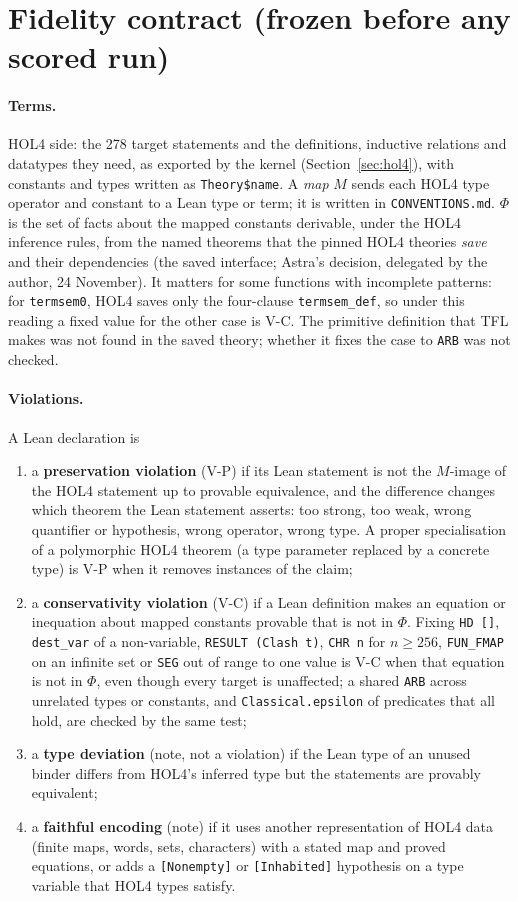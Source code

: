 \documentclass[11pt,a4paper]{article}
\newcommand{\code}[1]{\texttt{#1}}
\begin{document}
\section{Fidelity contract (frozen before any scored run)}\label{sec:contract}
\paragraph{Terms.} HOL4 side: the 278 target statements and the definitions, inductive relations and datatypes they need, as exported by the kernel (Section~\ref{sec:hol4}), with constants and types written as \code{Theory\$name}. A \emph{map} $M$ sends each HOL4 type operator and constant to a Lean type or term; it is written in \code{CONVENTIONS.md}. $\Phi$ is the set of facts about the mapped constants derivable, under the HOL4 inference rules, from the named theorems that the pinned HOL4 theories \emph{save} and their dependencies (the saved interface; Astra's decision, delegated by the author, 24 November). It matters for some functions with incomplete patterns: for \code{termsem0}, HOL4 saves only the four-clause \code{termsem\_def}, so under this reading a fixed value for the other case is V-C. The primitive definition that TFL makes was not found in the saved theory; whether it fixes the case to \code{ARB} was not checked.
\paragraph{Violations.} A Lean declaration is
\begin{enumerate}
\item a \textbf{preservation violation} (V-P) if its Lean statement is not the $M$-image of the HOL4 statement up to provable equivalence, and the difference changes which theorem the Lean statement asserts: too strong, too weak, wrong quantifier or hypothesis, wrong operator, wrong type. A proper specialisation of a polymorphic HOL4 theorem (a type parameter replaced by a concrete type) is V-P when it removes instances of the claim;
\item a \textbf{conservativity violation} (V-C) if a Lean definition makes an equation or inequation about mapped constants provable that is not in $\Phi$. Fixing \code{HD []}, \code{dest\_var} of a non-variable, \code{RESULT (Clash t)}, \code{CHR n} for $n\ge 256$, \code{FUN\_FMAP} on an infinite set or \code{SEG} out of range to one value is V-C when that equation is not in $\Phi$, even though every target is unaffected; a shared \code{ARB} across unrelated types or constants, and \code{Classical.epsilon} of predicates that all hold, are checked by the same test;
\item a \textbf{type deviation} (note, not a violation) if the Lean type of an unused binder differs from HOL4's inferred type but the statements are provably equivalent;
\item a \textbf{faithful encoding} (note) if it uses another representation of HOL4 data (finite maps, words, sets, characters) with a stated map and proved equations, or adds a \code{[Nonempty]} or \code{[Inhabited]} hypothesis on a type variable that HOL4 types satisfy.
\end{enumerate}
\end{document}
